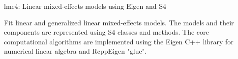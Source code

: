lme4: Linear mixed-effects models using Eigen and S4

Fit linear and generalized linear mixed-effects models. The models and their components are represented using S4 classes and methods. The core computational algorithms are implemented using the Eigen C++ library for numerical linear algebra and RcppEigen "glue".


